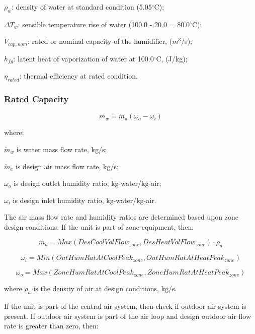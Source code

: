 \(\rho_{w}\): density of water at standard condition (5.05\(^{\circ}\)C);

\(\Delta T_{w}\): sensible temperature rise of water (100.0 - 20.0 = 80.0\(^{\circ}\)C);

\(V_{cap,nom}\): rated or nominal capacity of the humidifier, (\(m^{3}\)/s);

\(h_{fg}\): latent heat of vaporization of water at 100.0\(^{\circ}\)C, (J/kg);

\(\eta_{rated}\): thermal efficiency at rated condition.

\subsubsection{Rated Capacity}\label{rated-capacity}

\begin{equation}
{\dot m_w} = {\dot m_a}\left( {{\omega_o} - {\omega_i}} \right)
\end{equation}

where:

\({\dot m_w}\) is water mass flow rate, kg/s;

\({\dot m_a}\) is design air mass flow rate, kg/s;

\(\omega_{o}\) is design outlet humidity ratio, kg-water/kg-air;

\(\omega_{i}\) is design inlet humidity ratio, kg-water/kg-air.

The air mass flow rate and humidity ratios are determined based upon zone design conditions. If the unit is part of zone equipment, then:

\begin{equation}
{\dot m_a} = Max\left( {DesCoolVolFlo{w_{zone}},DesHeatVolFlo{w_{zone}}} \right) \cdot {\rho_a}
\end{equation}

\begin{equation}
{\omega_i} = Min\left( {OutHumRatAtCoolPea{k_{zone}},OutHumRatAtHeatPea{k_{zone}}} \right)
\end{equation}

\begin{equation}
  {\omega_o} = Max\left( {ZoneHumRatAtCoolPea{k_{zone}},ZoneHumRatAtHeatPea{k_{zone}}} \right)
\end{equation}

where \(\rho_{a}\) is the density of air at design conditions, kg/s.

If the unit is part of the central air system, then check if outdoor air system is present. If outdoor air system is part of the air loop and design outdoor air flow rate is greater than zero, then:

